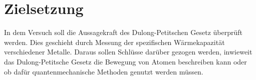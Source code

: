 \section{Zielsetzung}
\label{sec:Zielsetzung}

In dem Versuch soll die Aussagekraft des Dulong-Petitschen Gesetz überprüft werden.
Dies geschieht durch Messung der spezifischen Wärmekapazität verschiedener Metalle.
Daraus sollen Schlüsse darüber gezogen werden, inwieweit das Dulong-Petitsche Gesetz die Bewegung von Atomen beschreiben kann oder ob dafür quantenmechanische Methoden genutzt werden müssen.